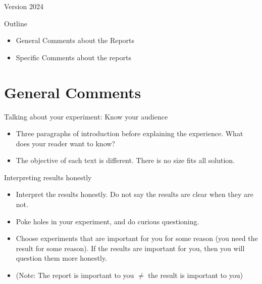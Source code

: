 \documentclass[aspectratio=169]{beamer}
\subtitle[Report 1 Review]{Report 1 Review}
\begin{document}
\begin{frame}
  \maketitle

  \vfill

  \hfill \tiny{Version 2024}
\end{frame}

\begin{frame}[t]{Outline}
  \begin{itemize}
    \item General Comments about the Reports
    \item Specific Comments about the reports
  \end{itemize}
  
\end{frame}

\section{General Comments}
\begin{frame}[t]{Talking about your experiment: Know your audience}
\begin{itemize}
  \item Three paragraphs of introduction before explaining the experience. What does your reader want to know?
  \item The objective of each text is different. There is no size fits all solution.
\end{itemize}
\end{frame}

\begin{frame}{Interpreting results honestly}
\begin{itemize}
  \item Interpret the results honestly. Do not say the results are clear when they are not.
  \item Poke holes in your experiment, and do curious questioning.
  \item Choose experiments that are important for you for some reason (you need the result for some reason). If the results are important for you, then you will question them more honestly.
  \item (Note: The report is important to you $\neq$ the result is important to you)
\end{itemize}  
\end{frame}
\end{document}
